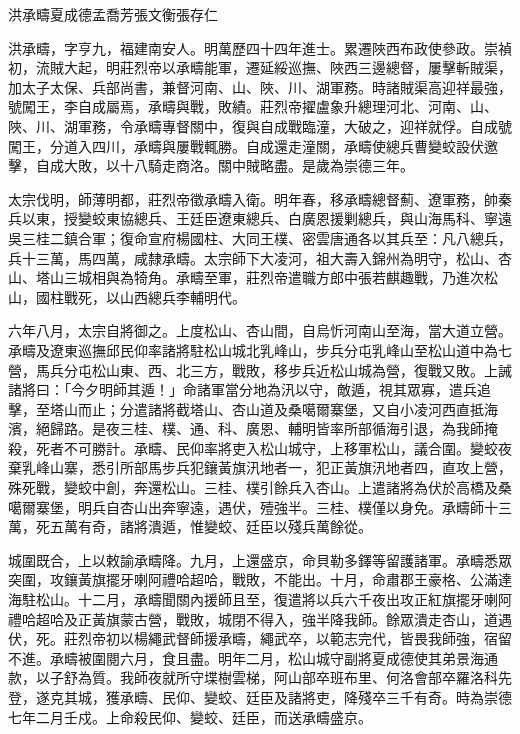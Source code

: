 
\begin{pinyinscope}
洪承疇夏成德孟喬芳張文衡張存仁

洪承疇，字亨九，福建南安人。明萬歷四十四年進士。累遷陜西布政使參政。崇禎初，流賊大起，明莊烈帝以承疇能軍，遷延綏巡撫、陜西三邊總督，屢擊斬賊渠，加太子太保、兵部尚書，兼督河南、山、陜、川、湖軍務。時諸賊渠高迎祥最強，號闖王，李自成屬焉，承疇與戰，敗績。莊烈帝擢盧象升總理河北、河南、山、陜、川、湖軍務，令承疇專督關中，復與自成戰臨潼，大破之，迎祥就俘。自成號闖王，分道入四川，承疇與屢戰輒勝。自成還走潼關，承疇使總兵曹變蛟設伏邀擊，自成大敗，以十八騎走商洛。關中賊略盡。是歲為崇德三年。

太宗伐明，師薄明都，莊烈帝徵承疇入衛。明年春，移承疇總督薊、遼軍務，帥秦兵以東，授變蛟東協總兵、王廷臣遼東總兵、白廣恩援剿總兵，與山海馬科、寧遠吳三桂二鎮合軍；復命宣府楊國柱、大同王樸、密雲唐通各以其兵至：凡八總兵，兵十三萬，馬四萬，咸隸承疇。太宗師下大凌河，祖大壽入錦州為明守，松山、杏山、塔山三城相與為犄角。承疇至軍，莊烈帝遣職方郎中張若麒趣戰，乃進次松山，國柱戰死，以山西總兵李輔明代。

六年八月，太宗自將御之。上度松山、杏山間，自烏忻河南山至海，當大道立營。承疇及遼東巡撫邱民仰率諸將駐松山城北乳峰山，步兵分屯乳峰山至松山道中為七營，馬兵分屯松山東、西、北三方，戰敗，移步兵近松山城為營，復戰又敗。上誡諸將曰：「今夕明師其遁！」命諸軍當分地為汛以守，敵遁，視其眾寡，遣兵追擊，至塔山而止；分遣諸將截塔山、杏山道及桑噶爾寨堡，又自小凌河西直抵海濱，絕歸路。是夜三桂、樸、通、科、廣恩、輔明皆率所部循海引退，為我師掩殺，死者不可勝計。承疇、民仰率將吏入松山城守，上移軍松山，議合圍。變蛟夜棄乳峰山寨，悉引所部馬步兵犯鑲黃旗汛地者一，犯正黃旗汛地者四，直攻上營，殊死戰，變蛟中創，奔還松山。三桂、樸引餘兵入杏山。上遣諸將為伏於高橋及桑噶爾寨堡，明兵自杏山出奔寧遠，遇伏，殪強半。三桂、樸僅以身免。承疇師十三萬，死五萬有奇，諸將潰遁，惟變蛟、廷臣以殘兵萬餘從。

城圍既合，上以敕諭承疇降。九月，上還盛京，命貝勒多鐸等留護諸軍。承疇悉眾突圍，攻鑲黃旗擺牙喇阿禮哈超哈，戰敗，不能出。十月，命肅郡王豪格、公滿達海駐松山。十二月，承疇聞關內援師且至，復遣將以兵六千夜出攻正紅旗擺牙喇阿禮哈超哈及正黃旗蒙古營，戰敗，城閉不得入，強半降我師。餘眾潰走杏山，道遇伏，死。莊烈帝初以楊繩武督師援承疇，繩武卒，以範志完代，皆畏我師強，宿留不進。承疇被圍閱六月，食且盡。明年二月，松山城守副將夏成德使其弟景海通款，以子舒為質。我師夜就所守堞樹雲梯，阿山部卒班布里、何洛會部卒羅洛科先登，遂克其城，獲承疇、民仰、變蛟、廷臣及諸將吏，降殘卒三千有奇。時為崇德七年二月壬戍。上命殺民仰、變蛟、廷臣，而送承疇盛京。


\end{pinyinscope}
